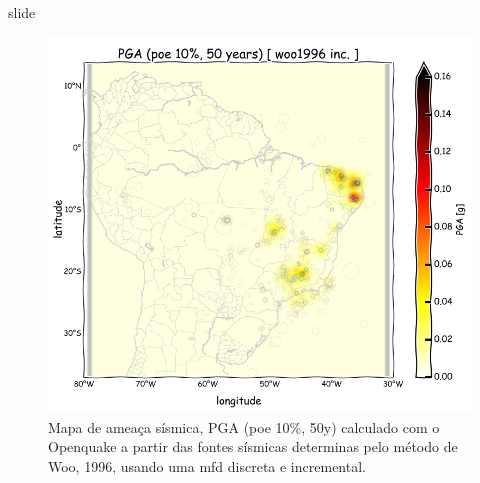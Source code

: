 \documentclass[ucs,8pt]{beamer}
\begin{document}
\begin{frame}{slide}

\begin{figure}[H]
  \centering
  \includegraphics[height=.80\textheight]{pga_woo_inc} 
  \caption{Mapa de ameaça sísmica, PGA (poe 10\%, 50y) 
  		   calculado com o Openquake a partir das fontes sísmicas
  		   determinas pelo método de Woo, 1996, usando uma \gls{mfd}
  		   discreta e incremental.
  }
  \label{fig:pga_woo_inc} 
\end{figure}

\end{frame}
\end{document}
